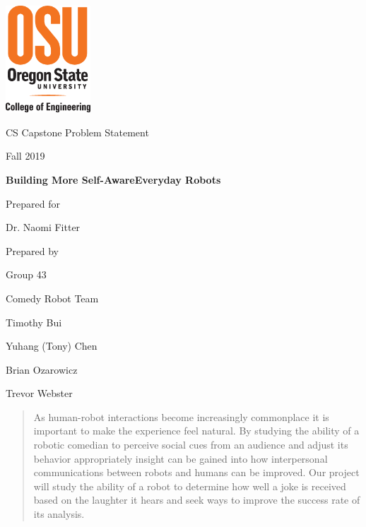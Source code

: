 \documentclass[onecolumn, draftclsnofoot,10pt, compsoc]{IEEEtran}
\def \CapstoneTeamName{		    Comedy Robot Team}
\def \CapstoneTeamNumber{		43}
\def \GroupMemberOne{			Timothy Bui}
\def \GroupMemberTwo{			Yuhang (Tony) Chen}
\def \GroupMemberThree{			Brian Ozarowicz}
\def \GroupMemberFour{			Trevor Webster}
\def \CapstoneProjectName{		Building More Self-Aware\linebreak Everyday Robots}
\def \CapstoneSponsorCompany{	SHARE Lab}
\def \CapstoneSponsorPerson{	Dr. Naomi Fitter}
\def \DocType{	Problem Statement
				}
\newcommand{\NameSigPair}[1]{\par
\makebox[2.75in][r]{#1} \hfil 	\makebox[3.25in]{\makebox[2.25in]{\hrulefill} \hfill		\makebox[.75in]{\hrulefill}}
\par\vspace{-12pt} \textit{\tiny\noindent
\makebox[2.75in]{} \hfil		\makebox[3.25in]{\makebox[2.25in][r]{Signature} \hfill	\makebox[.75in][r]{Date}}}}
\renewcommand{\NameSigPair}[1]{#1}
\begin{document}
\begin{titlepage}
    \begin{singlespace}
    	\includegraphics[height=4cm]{coe_v_spot1}
        \hfill 
        \par\vspace{.2in}
        \centering
        \scshape{
            \huge CS Capstone \DocType \par
            {\large Fall 2019}\par
            \vspace{.5in}
            \textbf{\Huge\CapstoneProjectName}\par
            \vfill
            {\large Prepared for}\par
            {\Large\NameSigPair{\CapstoneSponsorPerson}\par}
            {\large Prepared by }\par
            Group\CapstoneTeamNumber\par
            \CapstoneTeamName\par 
            \vspace{5pt}
            {\Large
                \NameSigPair{\GroupMemberOne}\par
                \NameSigPair{\GroupMemberTwo}\par
                \NameSigPair{\GroupMemberThree}\par
                \NameSigPair{\GroupMemberFour}\par
            }
            \vspace{20pt}
        }
        \begin{abstract}
        	\noindent As human-robot interactions become increasingly commonplace it is important to make the experience feel natural. By studying the ability of a robotic comedian to perceive social cues from an audience and adjust its behavior appropriately insight can be gained into how interpersonal communications between robots and humans can be improved. Our project will study the ability of a robot to determine how well a joke is received based on the laughter it hears and seek ways to improve the success rate of its analysis.
        \end{abstract}
    \end{singlespace}
\end{titlepage}
\end{document}
